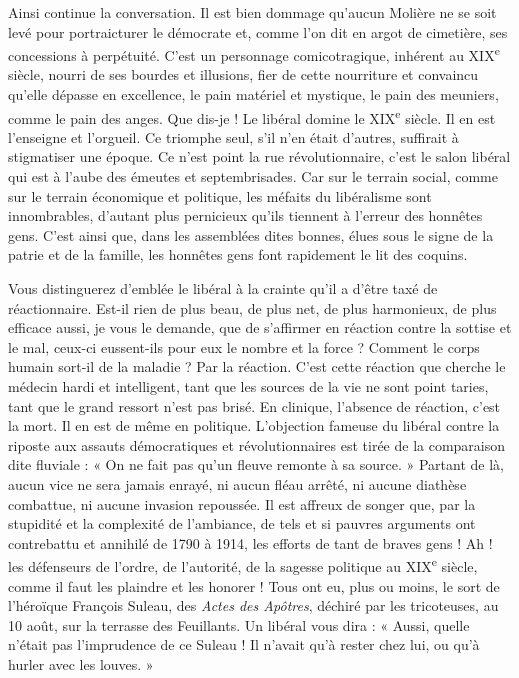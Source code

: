 \documentclass[french,twoside]{book} %
\begin{document}
Ainsi continue la conversation. Il est bien dommage qu’aucun Molière ne se soit levé pour portraicturer le démocrate et, comme l’on dit en argot de cimetière, ses concessions à perpétuité. C’est un personnage comicotragique, inhérent au XIX\textsuperscript{e} siècle, nourri de ses bourdes et illusions, fier de cette nourriture et convaincu qu’elle dépasse en excellence, le pain matériel et mystique, le pain des meuniers, comme le pain des anges. Que dis-je ! Le libéral domine le XIX\textsuperscript{e} siècle. Il en est l’enseigne et l’orgueil. Ce triomphe seul, s’il n’en était d’autres, suffirait à stigmatiser une époque. Ce n’est point la rue révolutionnaire, c’est le salon libéral qui est à l’aube des émeutes et septembrisades. Car sur le terrain social, comme sur le terrain économique et politique, les méfaits du libéralisme sont innombrables, d’autant plus pernicieux qu’ils tiennent à l’erreur des honnêtes gens. C’est ainsi que, dans les assemblées dites bonnes, élues sous le signe de la patrie et de la famille, les honnêtes gens font rapidement le lit des coquins.\par
Vous distinguerez d’emblée le libéral à la crainte qu’il a d’être taxé de réactionnaire. Est-il rien de plus beau, de plus net, de plus harmonieux, de plus efficace aussi, je vous le demande, que de s’affirmer en réaction contre la sottise et le mal, ceux-ci eussent-ils pour eux le nombre et la force ? Comment le corps humain sort-il de la maladie ? Par la réaction. C’est cette réaction que cherche le médecin hardi et intelligent, tant que les sources de la vie ne sont point taries, tant que le grand ressort n’est pas brisé. En clinique, l’absence de réaction, c’est la mort. Il en est de même en politique. L’objection fameuse du libéral contre la riposte aux assauts démocratiques et révolutionnaires est tirée de la comparaison dite fluviale : « On ne fait pas qu’un fleuve remonte à sa source. » Partant de là, aucun vice ne sera jamais enrayé, ni aucun fléau arrêté, ni aucune diathèse combattue, ni aucune invasion repoussée. Il est affreux de songer que, par la stupidité et la complexité de l’ambiance, de tels et si pauvres arguments ont contrebattu et annihilé de 1790 à 1914, les efforts de tant de braves gens ! Ah ! les défenseurs de l’ordre, de l’autorité, de la sagesse politique au XIX\textsuperscript{e} siècle, comme il faut les plaindre et les honorer ! Tous ont eu, plus ou moins, le sort de l’héroïque François Suleau, des {\itshape Actes des Apôtres}, déchiré par les tricoteuses, au 10 août, sur la terrasse des Feuillants. Un libéral vous dira : « Aussi, quelle n’était pas l’imprudence de ce Suleau ! Il n’avait qu’à rester chez lui, ou qu’à hurler avec les louves. »\par
\end{document}
